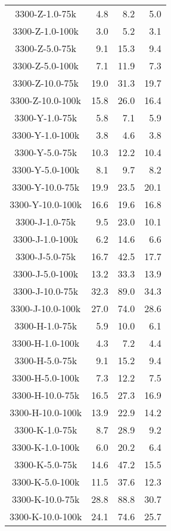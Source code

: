\begin{longtable}{crrr}
    3300-Z-1.0-75k &   4.8 &    8.2 &   5.0 \\
    3300-Z-1.0-100k &   3.0 &    5.2 &   3.1 \\
    3300-Z-5.0-75k &   9.1 &   15.3 &   9.4 \\
    3300-Z-5.0-100k &   7.1 &   11.9 &   7.3 \\
    3300-Z-10.0-75k &  19.0 &   31.3 &  19.7 \\
    3300-Z-10.0-100k &  15.8 &   26.0 &  16.4 \\
    3300-Y-1.0-75k &   5.8 &    7.1 &   5.9 \\
    3300-Y-1.0-100k &   3.8 &    4.6 &   3.8 \\
    3300-Y-5.0-75k &  10.3 &   12.2 &  10.4 \\
    3300-Y-5.0-100k &   8.1 &    9.7 &   8.2 \\
    3300-Y-10.0-75k &  19.9 &   23.5 &  20.1 \\
    3300-Y-10.0-100k &  16.6 &   19.6 &  16.8 \\
    3300-J-1.0-75k &   9.5 &   23.0 &  10.1 \\
    3300-J-1.0-100k &   6.2 &   14.6 &   6.6 \\
    3300-J-5.0-75k &  16.7 &   42.5 &  17.7 \\
    3300-J-5.0-100k &  13.2 &   33.3 &  13.9 \\
    3300-J-10.0-75k &  32.3 &   89.0 &  34.3 \\
    3300-J-10.0-100k &  27.0 &   74.0 &  28.6 \\
    3300-H-1.0-75k &   5.9 &   10.0 &   6.1 \\
    3300-H-1.0-100k &   4.3 &    7.2 &   4.4 \\
    3300-H-5.0-75k &   9.1 &   15.2 &   9.4 \\
    3300-H-5.0-100k &   7.3 &   12.2 &   7.5 \\
    3300-H-10.0-75k &  16.5 &   27.3 &  16.9 \\
    3300-H-10.0-100k &  13.9 &   22.9 &  14.2 \\
    3300-K-1.0-75k &   8.7 &   28.9 &   9.2 \\
    3300-K-1.0-100k &   6.0 &   20.2 &   6.4 \\
    3300-K-5.0-75k &  14.6 &   47.2 &  15.5 \\
    3300-K-5.0-100k &  11.5 &   37.6 &  12.3 \\
    3300-K-10.0-75k &  28.8 &   88.8 &  30.7 \\
    3300-K-10.0-100k &  24.1 &   74.6 &  25.7 \\

\end{longtable}
